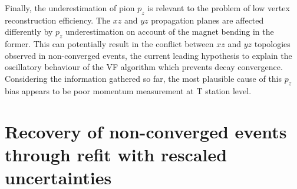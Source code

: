 Finally, the underestimation of pion $p_z$ is relevant to the problem of low vertex reconstruction efficiency.
The $xz$ and $yz$ propagation planes are affected differently by $p_z$ underestimation on account of the magnet bending in the former.
This can potentially result in the conflict between $xz$ and $yz$ topologies observed in non-converged events, the current leading hypothesis to explain the oscillatory behaviour of the VF algorithm which prevents decay convergence.
Considering the information gathered so far,
the most plausible cause of this $p_z$ bias appears to be poor momentum measurement at T station level.


\section[Recovery of non-converged events]{Recovery of non-converged events through refit with rescaled uncertainties}
\label{sec:recovery_general}
\label{sec:blowup_matrix}


